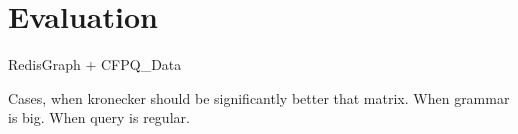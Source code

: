\section{Evaluation}

RedisGraph + CFPQ\_Data

Cases, when kronecker should be significantly better that matrix. 
When grammar is big.
When query is regular.